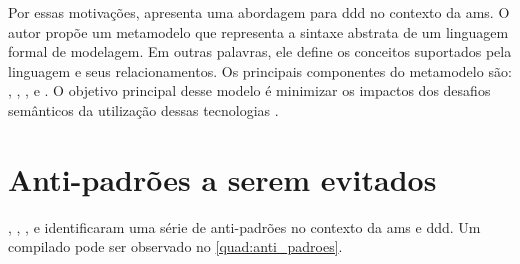 Por essas motivações,  apresenta uma abordagem para \acrshort{ddd} no contexto da \acrshort{ams}. O autor propõe um metamodelo que representa a sintaxe abstrata de um linguagem formal de modelagem. Em outras palavras, ele define os conceitos suportados pela linguagem e seus relacionamentos. Os principais componentes do metamodelo são: , , ,  e . O objetivo principal desse modelo é minimizar os impactos dos desafios semânticos da utilização dessas tecnologias \cite{Diepenbrock20171777}.

\section{Anti-padrões a serem evitados}
, , ,  e  identificaram uma série de anti-padrões no contexto da \acrshort{ams} e \acrshort{ddd}. Um compilado pode ser observado no \autoref{quad:anti_padroes}.

